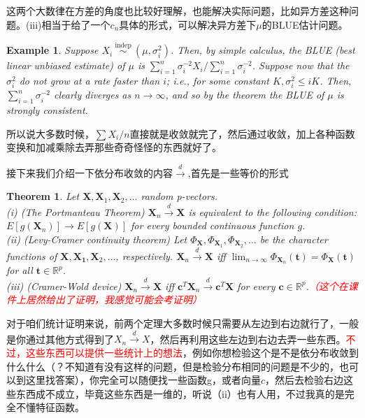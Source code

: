 \documentclass{article}
\newtheorem{theorem}{Theorem}[section]
\newtheorem{example}{Example}[section]
\begin{document}
这两个大数律在方差的角度也比较好理解，也能解决实际问题，比如异方差这种问题。(iii)相当于给了一个$c_n$具体的形式，可以解决异方差下$\mu$的BLUE估计问题。
\begin{example}
	Suppose $X_i \stackrel{\text { indep }}{\sim}\left(\mu, \sigma_i^2\right)$. Then, by simple calculus, the BLUE (best linear unbiased estimate) of $\mu$ is $\sum_{i=1}^n \sigma_i^{-2} X_i / \sum_{i=1}^n \sigma_i^{-2}$. Suppose now that the $\sigma_i^2$ do not grow at a rate faster than $i$; i.e., for some constant $K, \sigma_i^2 \leq i K$. Then, $\sum_{i=1}^n \sigma_i^{-2}$ clearly diverges as $n \rightarrow \infty$, and so by the theorem the BLUE of $\mu$ is strongly consistent.
\end{example}
所以说大多数时候，$\sum X_i/n$直接就是收敛就完了，然后通过收敛，加上各种函数变换和加减乘除去弄那些奇奇怪怪的东西就好了。
\par 接下来我们介绍一下依分布收敛的内容$\stackrel{d}{\rightarrow}$,首先是一些等价的形式
\begin{theorem}
	Let $\mathbf{X}, \mathbf{X}_1, \mathbf{X}_2, \ldots$ random p-vectors.\\
	(i) (The Portmanteau Theorem) $\mathbf{X}_n \stackrel{d}{\rightarrow} \mathbf{X}$ is equivalent to the following condition: $E\left[g\left(\mathbf{X}_n\right)\right] \rightarrow E[g(\mathbf{X})]$ for every bounded continuous function $g$.\\
	(ii) (Levy-Cramer continuity theorem) Let $\Phi_{\mathbf{X}}, \Phi_{\mathbf{X}_1}, \Phi_{\mathbf{X}_2}, \ldots$ be the character functions of $\mathbf{X}, \mathbf{X}_{\mathbf{1}}, \mathbf{X}_2, \ldots$, respectively. $\mathbf{X}_n \stackrel{d}{\rightarrow} \mathbf{X}$ iff $\lim _{n \rightarrow \infty} \Phi_{\mathbf{X}_n}(\mathbf{t})=\Phi_{\mathbf{X}}(\mathbf{t})$ for all $\mathbf{t} \in \mathbb{R}^p$.\\
	(iii) (Cramer-Wold device) $\mathbf{X}_n \stackrel{d}{\rightarrow} \mathbf{X}$ iff $\mathbf{c}^T \mathbf{X}_n \stackrel{d}{\rightarrow} \mathbf{c}^T \mathbf{X}$ for every $\mathbf{c} \in \mathbb{R}^p$.\textcolor{red}{（这个在课件上居然给出了证明，我感觉可能会考证明）}
\end{theorem}
对于咱们统计证明来说，前两个定理大多数时候只需要从左边到右边就行了，一般是你通过其他方式得到了$X_n\stackrel{d}{\rightarrow}X$，然后再利用这些左边到右边去弄一些东西。\textcolor{red}{不过，这些东西可以提供一些统计上的想法}，例如你想检验这个是不是依分布收敛到什么什么（？不知道有没有这样的问题，但是检验分布相同的问题是不少的，也可以到这里找答案），你完全可以随便找一些函数g，或者向量$c$，然后去检验右边这些东西成不成立，毕竟这些东西是一维的，听说（ii）也有人用，不过我真的是完全不懂特征函数。
\end{document}
